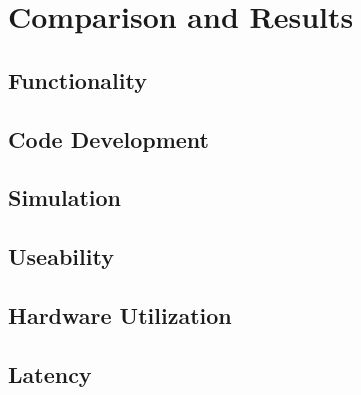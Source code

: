 \chapter{Comparison and Results}
\label{cha:ComparisonAndResults}
  \section{Functionality}

  \section{Code Development}
  \section{Simulation}
  \section{Useability}
  \section{Hardware Utilization}
  \section{Latency}

